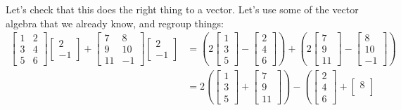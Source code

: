 Let's check that this does the right thing to a vector.  Let's use some
of the vector algebra that we already know, and
regroup things:
\begin{equation*}
\begin{split}
\begin{bmatrix}
1 & 2 \\
3 & 4 \\
5 & 6
\end{bmatrix}
\begin{bmatrix}
2 \\ -1
\end{bmatrix}
+
\begin{bmatrix}
7 & 8 \\
9 & 10 \\
11 & -1
\end{bmatrix}
\begin{bmatrix}
2 \\ -1
\end{bmatrix}
& =
\left(
2
\begin{bmatrix}
1 \\
3 \\
5
\end{bmatrix}
-
\begin{bmatrix}
2 \\
4 \\
6
\end{bmatrix}
\right)
+
\left(
2
\begin{bmatrix}
7 \\
9 \\
11
\end{bmatrix}
-
\begin{bmatrix}
8 \\
10 \\
-1
\end{bmatrix}
\right)
\\
& = 
2
\left(
\begin{bmatrix}
1 \\
3 \\
5
\end{bmatrix}
+
\begin{bmatrix}
7 \\
9 \\
11
\end{bmatrix}
\right)
-
\left(
\begin{bmatrix}
2 \\
4 \\
6
\end{bmatrix}
+
\begin{bmatrix}
8 \\

\end{bmatrix}
\end{split}
\end{equation*}
